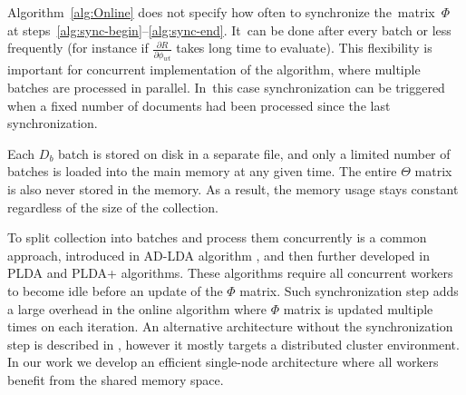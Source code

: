 \documentclass{sig-alternate-2013}
\newcommand{\kw}[1]{\textsf{#1}}
\begin{document}
Algorithm~\ref{alg:Online} does not specify how often to synchronize the~matrix~$\Phi$
at steps~\ref{alg:sync-begin}--\ref{alg:sync-end}.
It~can be done after every batch or less frequently
(for instance if $\frac{\partial R}{\partial \phi_{wt}}$ takes long time to evaluate).
This flexibility is important for concurrent implementation of the algorithm,
where multiple batches are processed in parallel.
In~this case synchronization can be triggered when a fixed number of documents had been processed since the last synchronization.


Each $D_b$ batch is stored on disk in a separate file,
and only a limited number of batches is loaded into the main memory at any given time.
The entire $\Theta$ matrix is also never stored in the memory.
As a result, the memory usage stays constant regardless of the size of the collection.


To split collection into batches and process them concurrently is a common approach,
introduced in AD-LDA algorithm \cite{newman09distributed}, and
then further developed in PLDA \cite{wang09plda} and PLDA{+} \cite{liu11plda} algorithms.
These algorithms require all concurrent workers to become idle before an update of the $\Phi$ matrix.
Such synchronization step adds a large overhead in the online algorithm where $\Phi$ matrix is updated multiple times on each iteration.
An alternative architecture without the synchronization step is described in \cite{smola10architecture},
however it mostly targets a distributed cluster environment.
In our work we develop an efficient single-node architecture where all workers benefit from the shared memory space.
\end{document}
